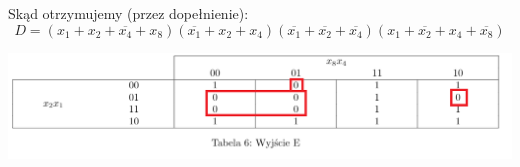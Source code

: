 \documentclass{article}
\begin{document}
            \FloatBarrier
            Skąd otrzymujemy (przez dopełnienie):
            $$D = (x_1+x_2+\overline{x_4}+x_8)(\overline{x_1}+x_2+x_4)(\overline{x_1}+\overline{x_2}+\overline{x_4})(x_1+\overline{x_2}+x_4+\overline{x_8})$$
            \begin{center}
                \includegraphics[width=18cm]{reports/img/Z1C_tab_6.png}\\
            \end{center}
                        
                         
                        
\end{document}
